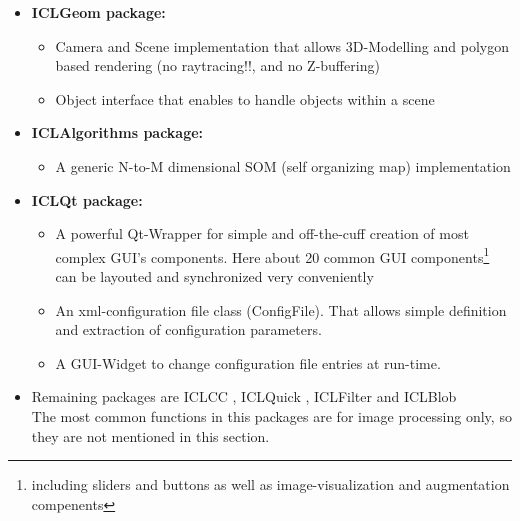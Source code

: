 \begin{itemize}
\item \textbf{ICLGeom package:} \\
\begin{itemize}
        \item Camera and Scene implementation that allows 3D-Modelling and polygon based rendering (no raytracing!!, and no Z-buffering) \\
              

        \item Object interface that enables to handle objects within a scene\\
\end{itemize}

\item \textbf{ICLAlgorithms package:} \\
\begin{itemize}
        \item A generic N-to-M dimensional SOM (self organizing map) implementation\\
         
\end{itemize}

\item \textbf{ICLQt package:} \\
\begin{itemize}
        \item A powerful Qt-Wrapper for simple and off-the-cuff creation of most complex GUI's components. Here about 20 common GUI components\footnote{including sliders and buttons as well as image-visualization and augmentation compenents} can be layouted and synchronized very conveniently\\

        \item An xml-configuration file class (ConfigFile). That allows simple definition and extraction of configuration parameters.\\

        \item A GUI-Widget to change configuration file entries at run-time.\\
\end{itemize}

\item Remaining packages are ICLCC , ICLQuick , ICLFilter  and ICLBlob \\
The most common functions in this packages are for image processing only, so they are not mentioned in this section.


\end{itemize}

